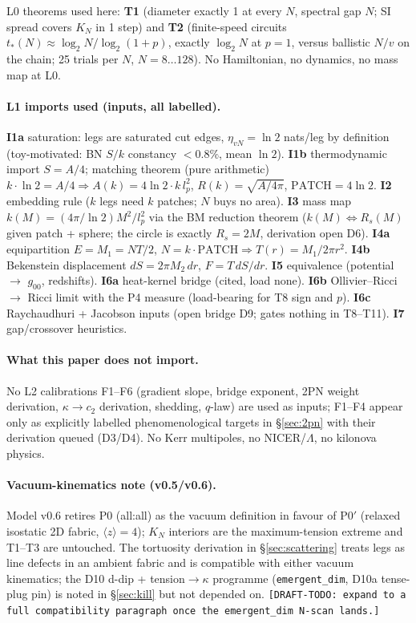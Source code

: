 \documentclass[11pt]{article}
\begin{document}
L0 theorems used here: \textbf{T1} (diameter exactly 1 at every $N$, spectral gap $N$; SI spread covers $K_N$ in 1 step) and \textbf{T2} (finite-speed circuits $t_*(N) \approx \log_2 N/\log_2(1+p)$, exactly $\log_2 N$ at $p = 1$, versus ballistic $N/v$ on the chain; 25 trials per $N$, $N = 8\ldots128$). No Hamiltonian, no dynamics, no mass map at L0.

\paragraph{L1 imports used (inputs, all labelled).} \textbf{I1a} saturation: legs are saturated cut edges, $\eta_{vN} = \ln 2$ nats/leg by definition (toy-motivated: BN $S/k$ constancy $< 0.8\%$, mean $\ln 2$). \textbf{I1b} thermodynamic import $S = A/4$; matching theorem (pure arithmetic) $k\cdot\ln 2 = A/4 \Rightarrow A(k) = 4\ln 2\cdot k\,l_p^2$, $R(k) = \sqrt{A/4\pi}$, $\mathrm{PATCH} = 4\ln 2$. \textbf{I2} embedding rule ($k$ legs need $k$ patches; $N$ buys no area). \textbf{I3} mass map $k(M) = (4\pi/\ln 2)M^2/l_p^2$ via the BM reduction theorem ($k(M) \iff R_s(M)$ given patch + sphere; the circle is exactly $R_s = 2M$, derivation open D6). \textbf{I4a} equipartition $E = M_1 = NT/2$, $N = k\cdot\mathrm{PATCH} \Rightarrow T(r) = M_1/2\pi r^2$. \textbf{I4b} Bekenstein displacement $dS = 2\pi M_2\,dr$, $F = T\,dS/dr$. \textbf{I5} equivalence (potential $\to$ $g_{00}$, redshifts). \textbf{I6a} heat-kernel bridge (cited, load none). \textbf{I6b} Ollivier--Ricci $\to$ Ricci limit with the P4 measure (load-bearing for T8 sign and $p$). \textbf{I6c} Raychaudhuri + Jacobson inputs (open bridge D9; gates nothing in T8--T11). \textbf{I7} gap/crossover heuristics.

\paragraph{What this paper does not import.} No L2 calibrations F1--F6 (gradient slope, bridge exponent, 2PN weight derivation, $\kappa \to c_2$ derivation, shedding, $q$-law) are used as inputs; F1--F4 appear only as explicitly labelled phenomenological targets in \S\ref{sec:2pn} with their derivation queued (D3/D4). No Kerr multipoles, no NICER/$\Lambda$, no kilonova physics.

\paragraph{Vacuum-kinematics note (v0.5/v0.6).} Model v0.6 retires P0 (all:all) as the vacuum definition in favour of P0$'$ (relaxed isostatic 2D fabric, $\langle z \rangle = 4$); $K_N$ interiors are the maximum-tension extreme and T1--T3 are untouched. The tortuosity derivation in \S\ref{sec:scattering} treats legs as line defects in an ambient fabric and is compatible with either vacuum kinematics; the D10 d-dip + tension$\to\kappa$ programme (\texttt{emergent\_dim}, D10a tense-plug pin) is noted in \S\ref{sec:kill} but not depended on. \texttt{[DRAFT-TODO: expand to a full compatibility paragraph once the emergent\_dim N-scan lands.]}
\end{document}
